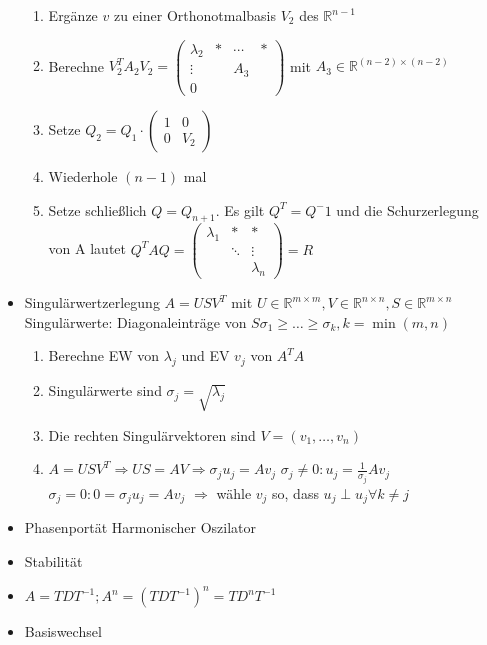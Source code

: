 \documentclass[7pt,a4paper]{scrartcl}
\newcommand{\R}{\ensuremath{\mathbb R}}
\begin{document}
\begin{multicols}{3}
\begin{itemize}
\begin{enumerate}
			\item Ergänze $v$ zu einer Orthonotmalbasis $V_2$ des $\R^{n-1}$
			\item Berechne $V_2^T A_2 V_2 = \begin{pmatrix}
			\lambda_2 & * & \cdots & * \\
			\vdots & & A_3 \\
			0 
			\end{pmatrix}$ mit $A_3 \in \R^{(n-2)\times(n-2)}$
			\item Setze $Q_2 = Q_1 \cdot \begin{pmatrix}
				1 & 0 \\
				0 & V_2
			\end{pmatrix}$
			\item Wiederhole $(n-1)$ mal
			\item Setze schließlich $Q=Q_{n+1}$. Es gilt $Q^T = Q^-1$ und die Schurzerlegung von A lautet $Q^T A Q = \begin{pmatrix}
			\lambda_1 & * & * \\
			& \ddots & \vdots \\ 
			& & \lambda_n \end{pmatrix} = R$
		\end{enumerate}
	\item Singulärwertzerlegung
	\subitem $A=U S V^T$ mit $U \in \R^{m\times m}, V \in \R^{n\times n}, S\in \R^{m\times n}$
	\subitem Singulärwerte: Diagonaleinträge von $S \sigma_1 \geq … \geq \sigma_k, k=\min(m,n)$ 
	\begin{enumerate}
		\item Berechne EW von $\lambda_j$ und EV $v_j$ von $A^T A$
		\item Singulärwerte sind $\sigma_j=\sqrt{\lambda_j}$
		\item Die rechten Singulärvektoren sind $V=(v_1,…,v_n)$
		\item $A=U S V^T \Rightarrow U S = A V \Rightarrow \sigma_j u_j=A v_j$
		\subitem $\sigma_j \neq 0: u_j = \frac{1}{\sigma_j} A v_j$
		\subitem $\sigma_j = 0 : 0=\sigma_j u_j = A v_j$
		$\Rightarrow$ wähle $v_j$ so, dass $u_j \perp u_j \forall k \neq j$
	\end{enumerate}
	\item Phasenportät
		\subitem 
		\subitem Harmonischer Oszilator
	\item Stabilität
	\item $A = T D T^{-1}; A^n=(T D T^{-1})^n=T D^n T^{-1}$
	\item Basiswechsel
\end{itemize}


\end{multicols}
\end{document}
